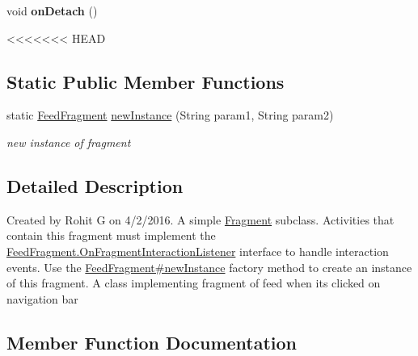 \begin{DoxyCompactItemize}
\begin{DoxyCompactItemize}
\item 
\hypertarget{classcom_1_1example_1_1sel_1_1lostfound_1_1FeedFragment_a1cc06e44e371cfc7f6b0bb5da15f78f0}{void {\bfseries on\-Detach} ()}\label{classcom_1_1example_1_1sel_1_1lostfound_1_1FeedFragment_a1cc06e44e371cfc7f6b0bb5da15f78f0}

\end{DoxyCompactItemize}
<<<<<<< HEAD
\subsection*{Static Public Member Functions}
\begin{DoxyCompactItemize}
\item 
static \hyperlink{classcom_1_1example_1_1sel_1_1lostfound_1_1FeedFragment}{Feed\-Fragment} \hyperlink{classcom_1_1example_1_1sel_1_1lostfound_1_1FeedFragment_a63f279103cc59000c74087d6addb351f}{new\-Instance} (String param1, String param2)
\begin{DoxyCompactList}\small\item\em new instance of fragment \end{DoxyCompactList}\end{DoxyCompactItemize}


\subsection{Detailed Description}
Created by Rohit G on 4/2/2016. A simple \hyperlink{}{Fragment} subclass. Activities that contain this fragment must implement the \hyperlink{interfacecom_1_1example_1_1sel_1_1lostfound_1_1FeedFragment_1_1OnFragmentInteractionListener}{Feed\-Fragment.\-On\-Fragment\-Interaction\-Listener} interface to handle interaction events. Use the \hyperlink{classcom_1_1example_1_1sel_1_1lostfound_1_1FeedFragment_a63f279103cc59000c74087d6addb351f}{Feed\-Fragment\#new\-Instance} factory method to create an instance of this fragment. A class implementing fragment of feed when its clicked on navigation bar 

\subsection{Member Function Documentation}
\hypertarget{classcom_1_1example_1_1sel_1_1lostfound_1_1FeedFragment_a63f279103cc59000c74087d6addb351f}{
}
\end{DoxyCompactItemize}
